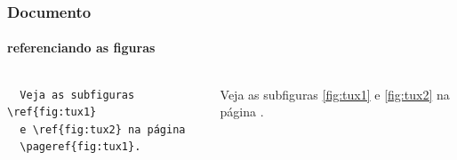 \begin{frame}[fragile]
\frametitle{Documento}
\framesubtitle{referenciando as figuras}
  \scriptsize
  \begin{columns}[c]
  \begin{verbatim}
  Veja as subfiguras \ref{fig:tux1} 
  e \ref{fig:tux2} na página 
  \pageref{fig:tux1}.
  \end{verbatim}
  \begin{fmpage}{\textwidth}
  Veja as subfiguras \ref{fig:tux1} e \ref{fig:tux2} na página \pageref{fig:tux1}.
  \end{fmpage}
  \end{columns}
\end{frame}
